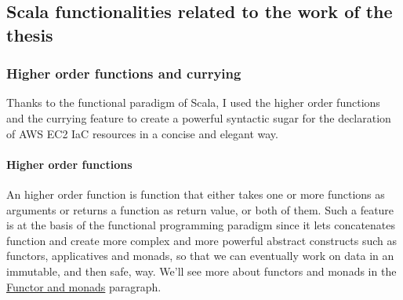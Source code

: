\subsection{Scala functionalities related to the work of the thesis}

\subsubsection{Higher order functions and currying}
Thanks to the functional paradigm of Scala, I used the higher order functions and the currying feature to create a powerful syntactic sugar for the declaration of AWS \gls{EC2} IaC resources in a 
concise and elegant way.
\paragraph{Higher order functions}
An higher order function is function that either takes one or more functions as arguments or returns a function as return value, or both of them.
Such a feature is at the basis of the functional programming paradigm since it lets concatenates function and create more complex and more powerful abstract constructs such as functors, applicatives and monads, so that we can eventually work on data in an immutable, and then safe, way.
We'll see more about functors and monads in the \hyperref[sssec:functors-monads]{Functor and monads} paragraph.
